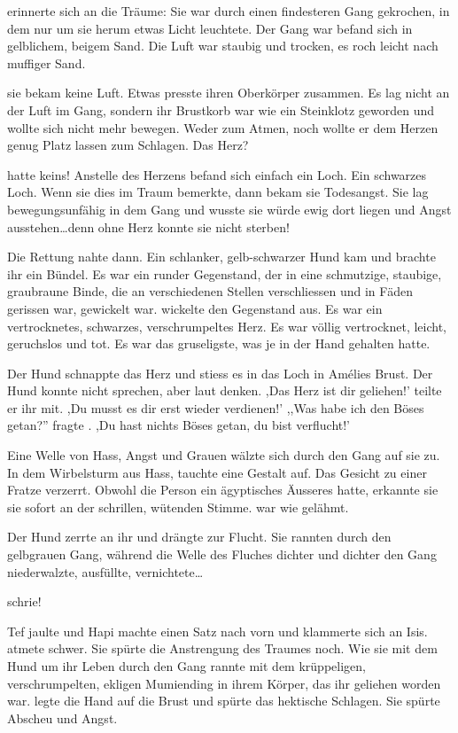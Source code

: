 \am erinnerte sich an die Träume: Sie war durch einen findesteren Gang gekrochen, in dem nur um sie herum etwas Licht leuchtete. Der Gang war befand sich in gelblichem, beigem Sand. Die Luft war staubig und trocken, es roch leicht nach muffiger Sand.

sie bekam keine Luft. Etwas presste ihren Oberkörper zusammen. Es lag nicht an der Luft im Gang, sondern ihr Brustkorb war wie ein Steinklotz geworden und wollte sich nicht mehr bewegen. Weder zum Atmen, noch wollte er dem Herzen genug Platz lassen zum Schlagen. Das Herz? 

\am hatte keins! Anstelle des Herzens befand sich einfach ein Loch. Ein schwarzes Loch. Wenn sie dies im Traum bemerkte, dann bekam sie Todesangst. Sie lag bewegungsunfähig in dem Gang und wusste sie würde ewig dort liegen und Angst ausstehen\dots denn ohne Herz konnte sie nicht sterben!

Die Rettung nahte dann. Ein schlanker, gelb-schwarzer Hund kam und brachte ihr ein Bündel. Es war ein runder Gegenstand, der in eine schmutzige, staubige, graubraune Binde, die an verschiedenen Stellen verschliessen und in Fäden gerissen war, gewickelt war. \am wickelte den Gegenstand aus. Es war ein vertrocknetes, schwarzes, verschrumpeltes Herz. Es war völlig vertrocknet, leicht, geruchslos und tot. Es war das gruseligste, was \am je in der Hand gehalten hatte. 

 Der Hund schnappte das Herz und stiess es in das Loch in Amélies Brust. Der Hund konnte nicht sprechen, aber laut denken. ,Das Herz ist dir geliehen!' teilte er ihr mit. ,Du musst es dir erst wieder verdienen!' ,,Was habe ich den Böses getan?'' fragte \am . ,Du hast nichts Böses getan, du bist verflucht!'
 
 Eine Welle von Hass, Angst und Grauen wälzte sich durch den Gang auf sie zu. In dem Wirbelsturm aus Hass, tauchte eine Gestalt auf. Das Gesicht zu einer Fratze verzerrt. Obwohl die Person ein ägyptisches Äusseres hatte, erkannte \am sie sie sofort an der schrillen, wütenden Stimme. \am war wie gelähmt.
 
 Der Hund zerrte an ihr und drängte \am zur Flucht. Sie rannten durch den gelbgrauen Gang, während die Welle des Fluches dichter und dichter den Gang niederwalzte, ausfüllte, vernichtete\dots
 
\am schrie!

Tef jaulte und Hapi machte einen Satz nach vorn und klammerte sich an Isis. \am atmete schwer. Sie spürte die Anstrengung des Traumes noch. Wie sie mit dem Hund um ihr Leben durch den Gang rannte mit dem krüppeligen, verschrumpelten, ekligen Mumiending in ihrem Körper, das ihr geliehen worden war. \am legte die Hand auf die Brust und spürte das hektische Schlagen. Sie spürte Abscheu und Angst.

